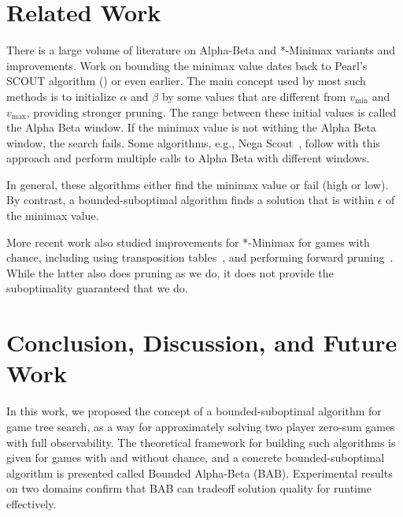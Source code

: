 \documentclass[runningheads]{llncs}
\newcommand{\vmax}{v_{\text{max}}}
\newcommand{\vmin}{v_{\text{min}}}
\begin{document}
\section{Related Work}

There is a large volume of literature on Alpha-Beta and *-Minimax variants and improvements. 
Work on bounding the minimax value dates back to Pearl's SCOUT algorithm (\citeyear{pearl1980scout}) or even earlier. The main concept used by most such methods is to initialize $\alpha$ and $\beta$ by some values that are different from $\vmin$ and $\vmax$, providing stronger pruning. 
The range between these initial values is called the Alpha Beta window. If the minimax value is not withing the Alpha Beta window, the search fails. Some algorithms, e.g., Nega Scout~\cite{reinefeld1983improvement}, follow with this approach and perform multiple calls to Alpha Beta with different windows. 

In general, these algorithms either find the minimax value or fail (high or low). By contrast, a bounded-suboptimal algorithm finds a solution that is within $\epsilon$ of the minimax value. %

More recent work also studied improvements for *-Minimax for games with chance, including using transposition tables~\cite{veness2007effective}, and performing forward pruning~\cite{schadd2009chanceprobcut}. While the latter also does pruning as we do, it does not provide the suboptimality guaranteed that we do. 

\section{Conclusion, Discussion, and Future Work}
In this work, we proposed the concept of a bounded-suboptimal algorithm for game tree search, as a way for approximately solving two player zero-sum games with full observability. The theoretical framework for building such algorithms is given for games with and without chance, and a concrete bounded-suboptimal algorithm is presented called Bounded Alpha-Beta (BAB). Experimental results on two domains confirm that BAB can tradeoff solution quality for runtime effectively. 
\end{document}
